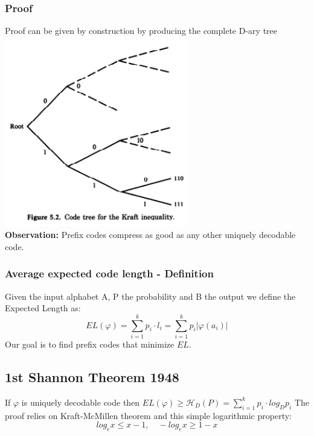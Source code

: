     \subsubsection{Proof}
    Proof can be given by construction by producing the complete D-ary tree \\
    \includegraphics[width=8cm]{Information Theory/Data Compression/Kraft-McMillen-Inequality-Proof-Diagram.png}\\
    \textbf{Observation:} Prefix codes compress as good as any other uniquely decodable code.
    \subsubsection{Average expected code length - Definition}
    Given the input alphabet A, P the probability and B the output we define the Expected Length as:
    \begin{equation}
        EL(\varphi)=\sum_{i=1}^{k}{p_i\cdot l_i}=\sum_{i=1}^{k}{p_i|\varphi(a_i)|}
    \end{equation}
    Our goal is to find prefix codes that minimize $EL$.
    
    \subsection{1st Shannon Theorem 1948}
    If $\varphi$ is uniquely decodable code then $EL(\varphi)\geq \mathcal{H}_D(P)=\sum_{i=1}^{k}{p_i\cdot log_D{p_i}}$
    The proof relies on Kraft-McMillen theorem and this simple logarithmic property:
    $$log_e{x}\leq x-1, \quad -log_e{x}\geq 1-x$$
